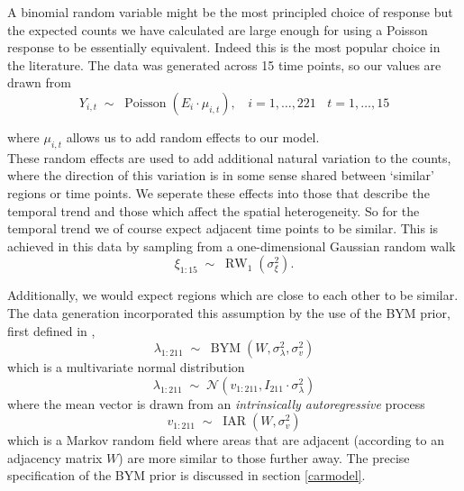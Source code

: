 \documentclass[11pt]{report}
\begin{document}
A binomial random variable might be the most principled choice of response but the expected counts we have calculated are large enough for using a Poisson response to be essentially equivalent. Indeed this is the most popular choice in the literature. The data was generated across 15 time points, so our values are drawn from
\begin{equation}
Y_{i,t} \; \sim \; \operatorname{Poisson}(E_i \cdot \mu_{i,t}), \ \ \ \ i=1,\ldots,221 \ \ \ \ t=1,\ldots,15
\end{equation}

where $\mu_{i,t}$ allows us to add random effects to our model. \\

These random effects are used to add additional natural variation to the counts, where the direction of this variation is in some sense shared between `similar' regions or time points. We seperate these effects into those that describe the temporal trend and those which affect the spatial heterogeneity. So for the temporal trend we of course expect adjacent time points to be similar. This is achieved in this data by sampling from a one-dimensional Gaussian random walk
\begin{equation}
\xi_{1:15} \; \sim \; \operatorname{RW}_1(\sigma_{\xi}^2).
\end{equation}

Additionally, we would expect regions which are close to each other to be similar. The data generation incorporated this assumption by the use of the BYM prior, first defined in \citet{bym},
\begin{equation}
\lambda_{1:211} \; \sim \; \operatorname{BYM}(W, \sigma_{\lambda}^2, \sigma_v^2) 
\end{equation}
which is a multivariate normal distribution
\begin{equation}
\lambda_{1:211} \; \sim \; \mathcal{N}(v_{1:211}, I_{211} \cdot\sigma_{\lambda}^2)
\end{equation} 
where the mean vector is drawn from an \emph{intrinsically autoregressive} process
\begin{equation}
v_{1:211} \; \sim \; \operatorname{IAR}(W, \sigma_v^2)
\end{equation}
which is a Markov random field where areas that are adjacent (according to an adjacency matrix $W$) are more similar to those further away. The precise specification of the BYM prior is discussed in section \ref{carmodel}. \\
\end{document}
